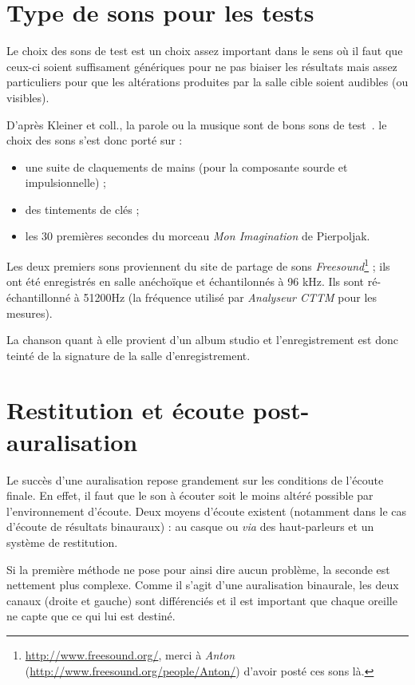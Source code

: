 \section{Type de sons pour les tests} %

Le choix des sons de test est un choix assez important dans le sens où il faut que ceux-ci soient suffisament génériques
pour ne pas biaiser les résultats mais assez particuliers pour que les altérations produites par la salle cible soient
audibles (ou visibles).

D'après Kleiner et coll., la parole ou la musique sont de bons sons de test~\cite{Kle93}. le choix des sons 
s'est donc porté sur :

\begin{itemize}
    \item une suite de claquements de mains (pour la composante sourde et impulsionnelle) ;
    \item des tintements de clés ;
    \item les 30 premières secondes du morceau \textit{Mon Imagination} de Pierpoljak.
\end{itemize}

Les deux premiers sons proviennent du site de partage de sons
\textit{Freesound}\footnote{\url{http://www.freesound.org/}, merci à \textit{Anton}
(\url{http://www.freesound.org/people/Anton/}) d'avoir posté ces sons là.} ; ils ont été enregistrés en salle anéchoïque
et échantilonnés à 96 kHz. Ils sont ré-échantillonné à 51200Hz (la fréquence utilisé par \textit{Analyseur CTTM} pour
les mesures).

La chanson quant à elle provient d'un album studio et l'enregistrement est donc teinté de la signature de la salle
d'enregistrement.

\section{Restitution et écoute post-auralisation} %

Le succès d'une auralisation repose grandement sur les conditions de l'écoute finale. En effet, il faut que le son à
écouter soit le moins altéré possible par l'environnement d'écoute. Deux moyens d'écoute existent (notamment dans le cas
d'écoute de résultats binauraux) : au casque ou \textit{via} des haut-parleurs et un système de restitution. 

Si la première méthode ne pose pour ainsi dire aucun problème, la seconde est nettement plus complexe.
Comme il s'agit d'une auralisation binaurale, les deux canaux (droite et gauche) sont différenciés et il est important
que chaque oreille ne capte que ce qui lui est destiné.

